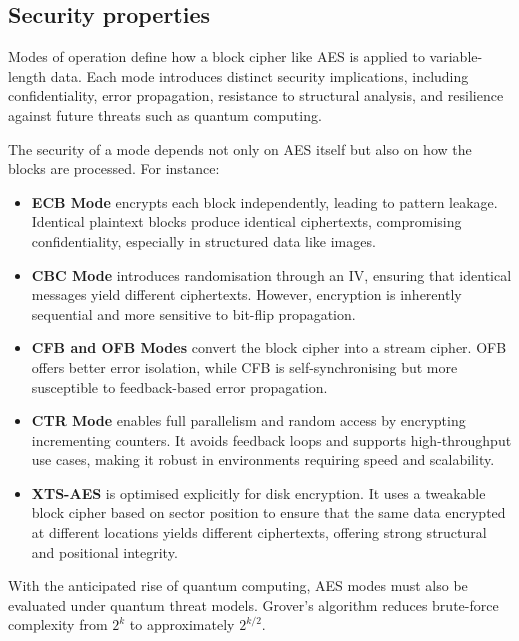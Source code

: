 \subsection{Security properties}

Modes of operation define how a block cipher like AES is applied to variable-length data. 
Each mode introduces distinct security implications, 
including confidentiality, error propagation, resistance to structural analysis, 
and resilience against future threats such as quantum computing.

The security of a mode depends not only on AES itself but also on how the blocks are processed. 
For instance:

\begin{itemize}
    \item \textbf{\Gls{ECB} Mode} encrypts each block independently, leading to pattern leakage. Identical plaintext blocks produce identical ciphertexts, compromising confidentiality, especially in structured data like images.
    
    \item \textbf{\Gls{CBC} Mode} introduces randomisation through an \Gls{IV}, ensuring that identical messages yield different ciphertexts. However, encryption is inherently sequential and more sensitive to bit-flip propagation.
    
    \item \textbf{\Gls{CFB} and \Gls{OFB} Modes} convert the block cipher into a stream cipher. OFB offers better error isolation, while CFB is self-synchronising but more susceptible to feedback-based error propagation.
    
    \item \textbf{\Gls{CTR} Mode} enables full parallelism and random access by encrypting incrementing counters. It avoids feedback loops and supports high-throughput use cases, making it robust in environments requiring speed and scalability.
    
    \item \textbf{\Gls{XTS}-AES} is optimised explicitly for disk encryption. It uses a tweakable block cipher based on sector position to ensure that the same data encrypted at different locations yields different ciphertexts, offering strong structural and positional integrity.
\end{itemize}

With the anticipated rise of quantum computing, 
AES modes must also be evaluated under quantum threat models. 
Grover's algorithm reduces brute-force complexity from $2^k$ to approximately $2^{k/2}$. 

